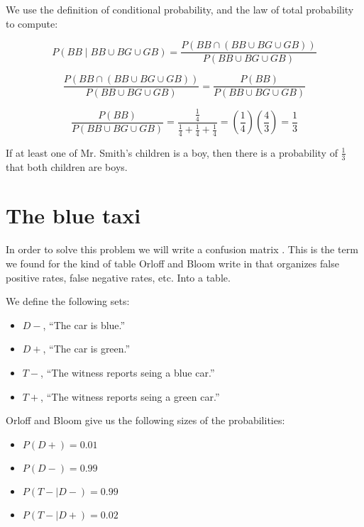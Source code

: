\documentclass[a4paper,11pt]{article}
\begin{document}
We use the definition of conditional probability, and the law of total
probability to compute:

\begin{equation}
P \left( BB \mid BB \cup BG \cup GB \right) 
= \frac{ P \left( BB \cap \left( BB \cup BG \cup GB \right) \right) }
  { P \left( BB \cup BG \cup GB \right) }
\end{equation}

\begin{equation}
\frac{ P \left( BB \cap \left( BB \cup BG \cup GB \right) \right) }
  { P \left( BB \cup BG \cup GB \right) }
= \frac{ P \left( BB \right)}
  { P \left( BB \cup BG \cup GB \right) }
\end{equation}

\begin{equation}
 \frac{ P \left( BB \right)}
  { P \left( BB \cup BG \cup GB \right) }
= \frac{ \frac{ 1}{4} }
  { \frac{1}{4} + \frac{1}{4} + \frac{1}{4}}
= \left( \frac{1}{4} \right) \left( \frac{4}{3} \right)
= \frac{1}{3}
\end{equation}

If at least one of Mr. Smith's children is a boy, then there is a 
probability of $\frac{1}{3}$ that both children are boys.

\section{The blue taxi}

In order to solve this problem we will write a confusion matrix
\cite{confusionMatrix}.  This is the term we found for the kind of 
table Orloff and Bloom write in \cite{reading3} that organizes false
positive rates, false negative rates, etc. Into a table.

We define the following sets:
  \begin{itemize}
  \item $D-$, ``The car is blue.''
  \item $D+$, ``The car is green.''
  \item $T-$, ``The witness reports seing a blue car.''
  \item $T+$, ``The witness reports seing a green car.''
\end{itemize}

Orloff and Bloom give us the following sizes of the probabilities:

\begin{itemize}
  \item $P \left( D+ \right) = 0.01$
  \item $P \left( D- \right) = 0.99$
  \item $P \left( T- \mid D- \right) = 0.99$
  \item $P \left( T- \mid D+ \right) = 0.02$
\end{itemize}
\end{document}
